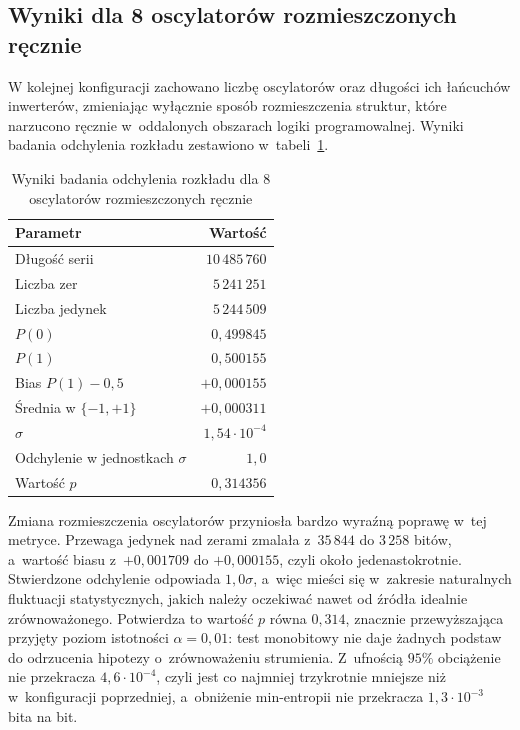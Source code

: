 \FloatBarrier

\subsection{Wyniki dla 8 oscylatorów rozmieszczonych ręcznie}

W kolejnej konfiguracji zachowano liczbę oscylatorów oraz długości ich łańcuchów
inwerterów, zmieniając wyłącznie sposób rozmieszczenia struktur, które narzucono
ręcznie w~oddalonych obszarach logiki programowalnej. Wyniki badania odchylenia
rozkładu zestawiono w~tabeli~\ref{tab:bias_ro8_manual}.

\begin{table}[H]
    \centering
    \caption{Wyniki badania odchylenia rozkładu dla 8 oscylatorów rozmieszczonych ręcznie}
    \label{tab:bias_ro8_manual}
    \small
    \begin{tabular}{lr}
        \toprule
        Parametr & Wartość \\
        \midrule
        Długość serii            & $10\,485\,760$ \\
        Liczba zer               & $5\,241\,251$ \\
        Liczba jedynek           & $5\,244\,509$ \\
        $P(0)$                   & $0{,}499845$ \\
        $P(1)$                   & $0{,}500155$ \\
        Bias $P(1)-0{,}5$        & $+0{,}000155$ \\
        Średnia w $\{-1,+1\}$    & $+0{,}000311$ \\
        $\sigma$                 & $1{,}54 \cdot 10^{-4}$ \\
        Odchylenie w jednostkach $\sigma$ & $1{,}0$ \\
        Wartość $p$              & $0{,}314356$ \\
        \bottomrule
    \end{tabular}
\end{table}

Zmiana rozmieszczenia oscylatorów przyniosła bardzo wyraźną poprawę w~tej
metryce. Przewaga jedynek nad zerami zmalała z~$35\,844$ do $3\,258$ bitów,
a~wartość biasu z~$+0{,}001709$ do $+0{,}000155$, czyli około jedenastokrotnie.
Stwierdzone odchylenie odpowiada $1{,}0\sigma$, a~więc mieści się w~zakresie
naturalnych fluktuacji statystycznych, jakich należy oczekiwać nawet od źródła
idealnie zrównoważonego. Potwierdza to wartość $p$ równa $0{,}314$, znacznie
przewyższająca przyjęty poziom istotności $\alpha = 0{,}01$: test monobitowy nie
daje żadnych podstaw do odrzucenia hipotezy o~zrównoważeniu strumienia.
Z~ufnością $95\%$ obciążenie nie przekracza $4{,}6 \cdot 10^{-4}$, czyli jest co
najmniej trzykrotnie mniejsze niż w~konfiguracji poprzedniej, a~obniżenie
min-entropii nie przekracza $1{,}3 \cdot 10^{-3}$ bita na bit.

